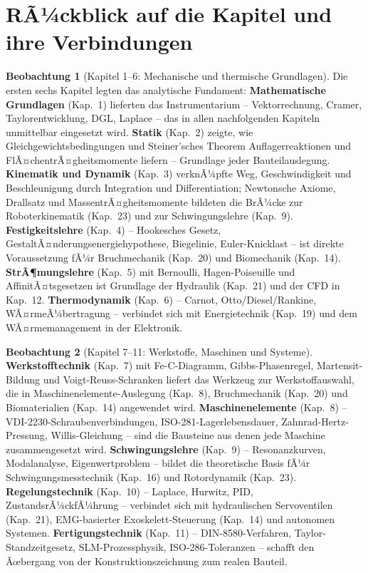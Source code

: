 ﻿\documentclass[a4paper,12pt]{report}
\theoremstyle{definition}
\newtheorem{beobachtung}{Beobachtung}
\begin{document}
\section{RÃ¼ckblick auf die Kapitel und ihre Verbindungen}

\begin{beobachtung}[Kapitel 1--6: Mechanische und thermische Grundlagen]
Die ersten sechs Kapitel legten das analytische Fundament:
\textbf{Mathematische Grundlagen} (Kap.~1) lieferten das Instrumentarium
-- Vektorrechnung, Cramer, Taylorentwicklung, DGL, Laplace --
das in allen nachfolgenden Kapiteln unmittelbar eingesetzt wird.
\textbf{Statik} (Kap.~2) zeigte, wie Gleichgewichtsbedingungen
und Steiner'sches Theorem Auflagerreaktionen und FlÃ¤chentrÃ¤gheitsmomente
liefern -- Grundlage jeder Bauteilauslegung.
\textbf{Kinematik und Dynamik} (Kap.~3) verknÃ¼pfte Weg, Geschwindigkeit
und Beschleunigung durch Integration und Differentiation;
Newtonsche Axiome, Drallsatz und MassentrÃ¤gheitsmomente
bildeten die BrÃ¼cke zur Roboterkinematik (Kap.~23) und zur
Schwingungslehre (Kap.~9).
\textbf{Festigkeitslehre} (Kap.~4) -- Hookesches Gesetz, GestaltÃ¤nderungsenergiehypothese,
Biegelinie, Euler-Knicklast -- ist direkte Voraussetzung fÃ¼r
Bruchmechanik (Kap.~20) und Biomechanik (Kap.~14).
\textbf{StrÃ¶mungslehre} (Kap.~5) mit Bernoulli, Hagen-Poiseuille
und AffinitÃ¤tsgesetzen ist Grundlage der Hydraulik (Kap.~21)
und der CFD in Kap.~12.
\textbf{Thermodynamik} (Kap.~6) -- Carnot, Otto/Diesel/Rankine,
WÃ¤rmeÃ¼bertragung -- verbindet sich mit Energietechnik (Kap.~19)
und dem WÃ¤rmemanagement in der Elektronik.
\end{beobachtung}

\begin{beobachtung}[Kapitel 7--11: Werkstoffe, Maschinen und Systeme]
\textbf{Werkstofftechnik} (Kap.~7) mit Fe-C-Diagramm, Gibbs-Phasenregel,
Martensit-Bildung und Voigt-Reuss-Schranken liefert das Werkzeug zur
Werkstoffauswahl, die in Maschinenelemente-Auslegung (Kap.~8),
Bruchmechanik (Kap.~20) und Biomaterialien (Kap.~14) angewendet wird.
\textbf{Maschinenelemente} (Kap.~8) -- VDI-2230-Schraubenverbindungen,
ISO-281-Lagerlebensdauer, Zahnrad-Hertz-Pressung, Willis-Gleichung --
sind die Bausteine aus denen jede Maschine zusammengesetzt wird.
\textbf{Schwingungslehre} (Kap.~9) -- Resonanzkurven, Modalanalyse,
Eigenwertproblem -- bildet die theoretische Basis fÃ¼r
Schwingungsmesstechnik (Kap.~16) und Rotordynamik (Kap.~23).
\textbf{Regelungstechnik} (Kap.~10) -- Laplace, Hurwitz, PID,
ZustandsrÃ¼ckfÃ¼hrung -- verbindet sich mit hydraulischen Servoventilen (Kap.~21),
EMG-basierter Exoskelett-Steuerung (Kap.~14) und autonomen Systemen.
\textbf{Fertigungstechnik} (Kap.~11) -- DIN-8580-Verfahren, Taylor-Standzeitgesetz,
SLM-Prozessphysik, ISO-286-Toleranzen -- schafft den Ãœbergang von
der Konstruktionszeichnung zum realen Bauteil.
\end{beobachtung}
\end{document}
